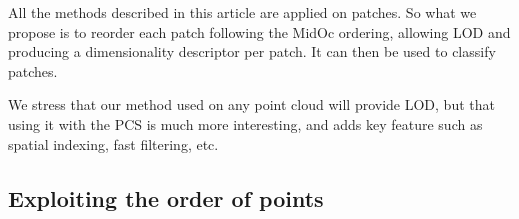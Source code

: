 		All the methods described in this article are applied on patches.
		So what we propose is to reorder each patch following the MidOc ordering, allowing LOD and producing a dimensionality descriptor per patch. It can then be used to classify patches.
		
		We stress that our method used on any point cloud will provide LOD,
		but that using it with the PCS is much more interesting,
		and adds key feature such as spatial indexing, fast filtering, etc. 
	 
%	
%	 
%	 	
%	 	
%	 	 
	 	 
	\subsection{Exploiting the order of points}
		\label{method.order}
			
			
